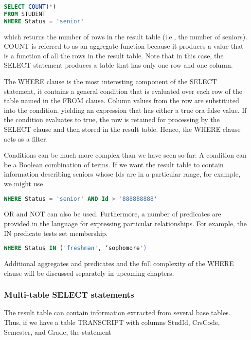 \documentclass[]{article}
\begin{document}
\begin{lstlisting}[language=SQL]
SELECT COUNT(*)
FROM STUDENT 
WHERE Status = 'senior' 
\end{lstlisting}

which returns the number of rows in the result table (i.e., the number
of seniors). COUNT is referred to as an aggregate function because it
produces a value that is a function of all the rows in the result table.
Note that in this case, the SELECT statement produces a table that has
only one row and one column.

The WHERE clause is the most interesting component of the SELECT
statement, it contains a general condition that is evaluated over each
row of the table named in the FROM clause. Column values from the row
are substituted into the condition, yielding an expression that has
either a true ora false value. If the condition evaluates to true, the
row is retained for processing by the SELECT clause and then stored in
the result table. Hence, the WHERE clause acts as a filter.

Conditions can be much more complex than we have seen so far: A
condition can be a Boolean combination of terms. If we want the result
table to contain information describing seniors whose Ids are in a
particular range, for example, we might use

\begin{lstlisting}[language=SQL]
WHERE Status = 'senior' AND Id > '888888888'
\end{lstlisting}

OR and NOT can also be used. Furthermore, a number of predicates are
provided in the language for expressing particular relationships. For
example, the IN predicate tests set membership.

\begin{lstlisting}[language=SQL]
WHERE Status IN ('freshman', ‘sophomore')
\end{lstlisting}

Additional aggregates and predicates and the full complexity of the
WHERE clause will be discussed separately in upcoming chapters.

\hypertarget{multi-table-select-statements}{%
\subsubsection{Multi-table SELECT
statements}\label{multi-table-select-statements}}

The result table can contain information extracted from several base
tables. Thus, if we have a table TRANSCRIPT with columns StudId,
CrsCode, Semester, and Grade, the statement
\end{document}
